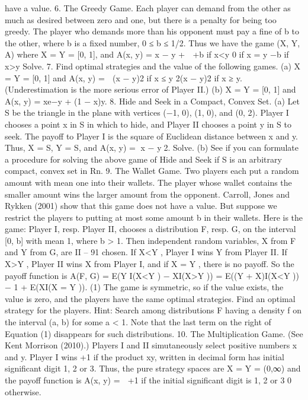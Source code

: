have a value.
6. The Greedy Game. Each player can demand from the other as much as desired
between zero and one, but there is a penalty for being too greedy. The player who demands
more than his opponent must pay a fine of b to the other, where b is a fixed number,
0 ≤ b ≤ 1/2. Thus we have the game (X, Y, A) where X = Y = [0, 1], and
A(x, y) = x − y +
 +b if x<y
0 if x = y
−b if x>y
Solve.
7. Find optimal strategies and the value of the following games.
(a) X = Y = [0, 1] and A(x, y) =  (x − y)2 if x ≤ y
2(x − y)2 if x ≥ y. (Underestimation is the more
serious error of Player II.)
(b) X = Y = [0, 1] and A(x, y) = xe−y + (1 − x)y.
8. Hide and Seek in a Compact, Convex Set. (a) Let S be the triangle in the
plane with vertices (−1, 0), (1, 0), and (0, 2). Player I chooses a point x in S in which to
hide, and Player II chooses a point y in S to seek. The payoff to Player I is the square
of Euclidean distance between x and y. Thus, X = S, Y = S, and A(x, y) = x − y2.
Solve.
(b) See if you can formulate a procedure for solving the above game of Hide and Seek
if S is an arbitrary compact, convex set in Rn.
9. The Wallet Game. Two players each put a random amount with mean one into
their wallets. The player whose wallet contains the smaller amount wins the larger amount
from the opponent.
Carroll, Jones and Rykken (2001) show that this game does not have a value. But
suppose we restrict the players to putting at most some amount b in their wallets. Here is
the game:
Player I, resp. Player II, chooses a distribution F, resp. G, on the interval [0, b] with
mean 1, where b > 1. Then independent random variables, X from F and Y from G, are
II – 91
chosen. If X<Y , Player I wins Y from Player II. If X>Y , Player II wins X from Player
I, and if X = Y , there is no payoff. So the payoff function is
A(F, G) = E(Y I(X<Y ) − XI(X>Y ))
= E((Y + X)I(X<Y )) − 1 + E(XI(X = Y )). (1)
The game is symmetric, so if the value exists, the value is zero, and the players have the
same optimal strategies. Find an optimal strategy for the players. Hint: Search among
distributions F having a density f on the interval (a, b) for some a < 1. Note that the last
term on the right of Equation (1) disappears for such distributions.
10. The Multiplication Game. (See Kent Morrison (2010).) Players I and II
simutaneously select positive numbers x and y. Player I wins +1 if the product xy, written
in decimal form has initial significant digit 1, 2 or 3. Thus, the pure strategy spaces are
X = Y = (0,∞) and the payoff function is
A(x, y) =  +1 if the initial significant digit is 1, 2 or 3
0 otherwise.
